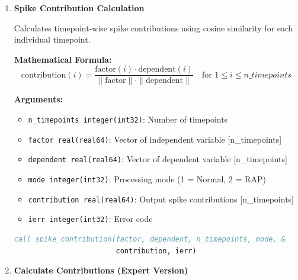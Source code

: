 \begin{enumerate}
\begin{enumerate}
            \item \textbf{Spike Contribution Calculation}
                  
                  Calculates timepoint-wise spike contributions using cosine similarity for
                  each individual timepoint.
                  
                  \textbf{Mathematical Formula:}
                  \[
                    \text{contribution}(i) = \frac{\text{factor}(i) \cdot \text{dependent}(i)}{\|\text{factor}\|
                        \cdot \|\text{dependent}\|}\quad \text{for }1 \le i \le n\_timepoints
                  \]
                  
                  \textbf{Arguments:}
                  \begin{itemize}
                    \item \texttt{n\_timepoints integer(int32)}: Number of timepoints
                          
                    \item \texttt{factor real(real64)}: Vector of independent variable [n\_timepoints]
                          
                    \item \texttt{dependent real(real64)}: Vector of dependent variable [n\_timepoints]
                          
                    \item \texttt{mode integer(int32)}: Processing mode (1 = Normal, 2 =
                          RAP)
                          
                    \item \texttt{contribution real(real64)}: Output spike contributions
                          [n\_timepoints]
                          
                    \item \texttt{ierr integer(int32)}: Error code
                  \end{itemize}
                  \begin{lstlisting}[language=Fortran, caption={Spike Contribution Calculation}]
call spike_contribution(factor, dependent, n_timepoints, mode, &
                        contribution, ierr)
                  \end{lstlisting}
                  
            \item \textbf{Calculate Contributions (Expert Version)}
                  

\end{enumerate}
\end{enumerate}
